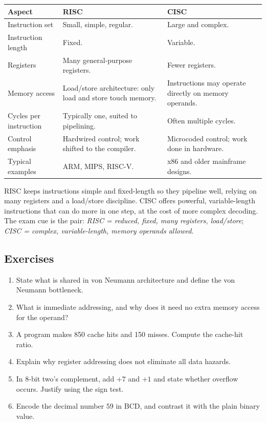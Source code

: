 \documentclass[11pt]{article}
\begin{document}
\begin{center}
\begin{tabular}{p{}p{}p{}}
\toprule
\textbf{Aspect} & \textbf{RISC} & \textbf{CISC} \\
\midrule
Instruction set & Small, simple, regular. & Large and complex. \\
Instruction length & Fixed. & Variable. \\
Registers & Many general-purpose registers. & Fewer registers. \\
Memory access & Load/store architecture: only load and store touch memory. & Instructions may operate directly on memory operands. \\
Cycles per instruction & Typically one, suited to pipelining. & Often multiple cycles. \\
Control emphasis & Hardwired control; work shifted to the compiler. & Microcoded control; work done in hardware. \\
Typical examples & ARM, MIPS, RISC-V. & x86 and older mainframe designs. \\
\bottomrule
\end{tabular}
\end{center}

RISC keeps instructions simple and fixed-length so they pipeline well, relying
on many registers and a load/store discipline. CISC offers powerful,
variable-length instructions that can do more in one step, at the cost of
more complex decoding. The exam cue is the pair: \emph{RISC = reduced, fixed,
many registers, load/store}; \emph{CISC = complex, variable-length, memory
operands allowed}.

\subsection*{Exercises}
\begin{enumerate}[label=\arabic*.]
  \item State what is shared in von Neumann architecture and define the von
    Neumann bottleneck.
  \item What is immediate addressing, and why does it need no extra memory
    access for the operand?
  \item A program makes 850 cache hits and 150 misses. Compute the
    cache-hit ratio.
  \item Explain why register addressing does not eliminate all data hazards.
  \item In 8-bit two's complement, add $+7$ and $+1$ and state whether
    overflow occurs. Justify using the sign test.
  \item Encode the decimal number $59$ in BCD, and contrast it with the plain
    binary value.
\end{enumerate}
\end{document}
